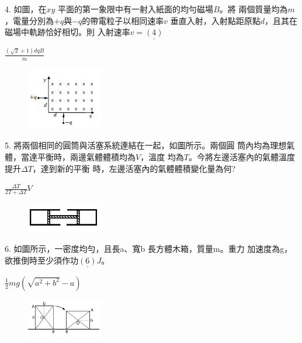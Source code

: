 \documentclass[cn,10pt,math=newtx,chinesefont=founder,device=ig]{elegantbook}
\begin{document}
\begin{example}
   4. 如圖，在$xy$ 平面的第一象限中有一射入紙面的均勻磁場$B$。將
兩個質量均為$m$，電量分別為$+q$與$-q$的帶電粒子以相同速率$v$
垂直入射，入射點距原點$d$，且其在磁場中軌跡恰好相切。則
入射速率$v= \underline{(4)}$ \\
    \rightline{[全國聯招教甄109]}
\end{example}
\begin{solution}
    $\frac{(\sqrt{2}+1) dqB}{m}$
\end{solution}
\begin{figure}[htbp]
    \flushright
    \includegraphics[width=0.3\textwidth]{image/109全國24.png}
  \end{figure}
\newpage



\begin{example}
   5. 將兩個相同的圓筒與活塞系統連結在一起，如圖所示。兩個圓
筒內均為理想氣體，當達平衡時，兩邊氣體體積均為$V$，溫度
均為$T$。今將左邊活塞內的氣體溫度提升$\Delta T$，達到新的平衡
時，左邊活塞內的氣體體積變化量為何?\\
    \rightline{[全國聯招教甄109]}
\end{example}
\begin{solution}
    $\frac{\Delta T}{2T+\Delta T} V$
\end{solution}
\begin{figure}[htbp]
    \flushright
    \includegraphics[width=0.3\textwidth]{image/109全國25.png}
  \end{figure}
\newpage



\begin{example}
   6. 如圖所示，一密度均勻，且長a、寬b 長方體木箱，質量m。重力
加速度為g，欲推倒時至少須作功$\underline{(6)} J$。 \\
    \rightline{[全國聯招教甄109]}
\end{example}
\begin{solution}
    $\frac{1}{2} mg(\sqrt{a^2 +b^2}-a)$
\end{solution}
\begin{figure}[htbp]
    \flushright
    \includegraphics[width=0.3\textwidth]{image/109全國26.png}
  \end{figure}
\newpage
\end{document}
